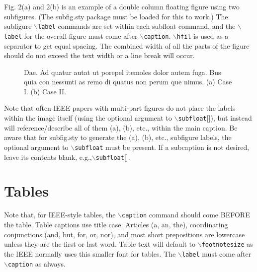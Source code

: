\documentclass[lettersize,journal]{IEEEtran}
\begin{document}
Fig. 2(a) and 2(b) is an example of a double column floating figure using two
subfigures. (The subfig.sty package must be loaded for this to work.) The
subfigure $\backslash${\tt{label}} commands are set within each subfloat
command, and the $\backslash${\tt{label}} for the overall figure must come
after $\backslash${\tt{caption}}. $\backslash${\tt{hfil}} is used as a
separator to get equal spacing. The combined width of all the parts of the
figure should do not exceed the text width or a line break will occur.
%
\begin{figure}[!t]
  \centering
  \hfil
  \caption{Dae. Ad quatur autat ut porepel itemoles dolor autem fuga. Bus quia con nessunti as remo di quatus non perum que nimus. (a) Case I. (b) Case II.}
  \label{fig_sim}
\end{figure}

Note that often IEEE papers with multi-part figures do not place the labels
within the image itself (using the optional argument to
$\backslash${\tt{subfloat}}[]), but instead will reference/describe all of them
(a), (b), etc., within the main caption. Be aware that for subfig.sty to
generate the (a), (b), etc., subfigure labels, the optional argument to
$\backslash${\tt{subfloat}} must be present. If a subcaption is not desired,
leave its contents blank, e.g.,$\backslash${\tt{subfloat}}[].

\section{Tables}
Note that, for IEEE-style tables, the $\backslash${\tt{caption}} command should
come BEFORE the table. Table captions use title case. Articles (a, an, the),
coordinating conjunctions (and, but, for, or, nor), and most short prepositions
are lowercase unless they are the first or last word. Table text will default
to $\backslash${\tt{footnotesize}} as the IEEE normally uses this smaller font
for tables. The $\backslash${\tt{label}} must come after
$\backslash${\tt{caption}} as always.
\end{document}
